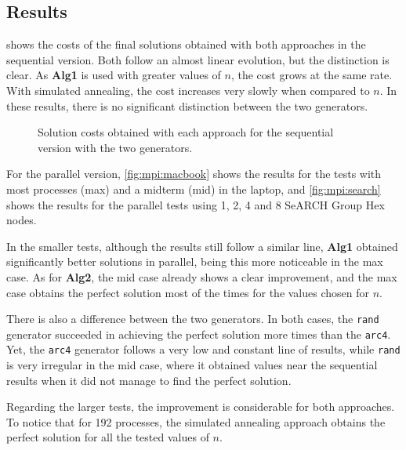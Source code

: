 \subsection{Results}
\label{sec:results}

 shows the costs of the final solutions obtained with both approaches in the sequential version. Both follow an almost linear evolution, but the distinction is clear. As \textbf{Alg1} is used with greater values of $n$, the cost grows at the same rate. With simulated annealing, the cost increases very slowly when compared to $n$. In these results, there is no significant distinction between the two generators.

\begin{figure*}[!htp]
	\centering
	\hfill
	\caption[Sequential solution costs]{Solution costs obtained with each approach for the sequential version with the two generators.}
	\label{fig:seq}
\end{figure*}

For the parallel version, \cref{fig:mpi:macbook} shows the results for the tests with most processes (max) and a midterm (mid) in the laptop, and \cref{fig:mpi:search} shows the results for the parallel tests using 1, 2, 4 and 8 SeARCH Group Hex nodes.

In the smaller tests, although the results still follow a similar line, \textbf{Alg1} obtained significantly better solutions in parallel, being this more noticeable in the max case. As for \textbf{Alg2}, the mid case already shows a clear improvement, and the max case obtains the perfect solution most of the times for the values chosen for $n$.

There is also a difference between the two generators. In both cases, the \texttt{rand} generator succeeded in achieving the perfect solution more times than the \texttt{arc4}. Yet, the \texttt{arc4} generator follows a very low and constant line of results, while \texttt{rand} is very irregular in the mid case, where it obtained values near the sequential results when it did not manage to find the perfect solution.

Regarding the larger tests, the improvement is considerable for both approaches. To notice that for 192 processes, the simulated annealing approach obtains the perfect solution for all the tested values of $n$.

